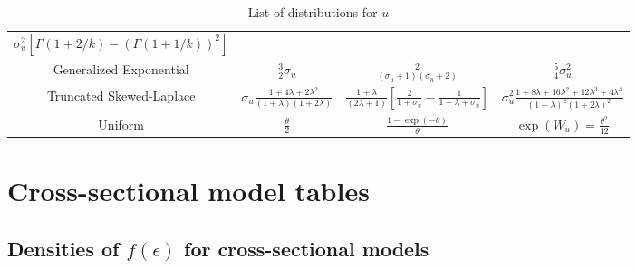 \documentclass[nojss]{jss}
\begin{document}
\begin{appendix}
\begin{table}[h]
\begin{adjustbox}{max width=1\textwidth}
\begin{tabular}{@{}cccc@{}}
$\sigma_u^2\left[\Gamma\left(1+2/k\right)-\left(\Gamma\left(1+1/k\right)\right)^2\right]$\\[1em]
Generalized Exponential & $\frac{3}{2}\sigma_u$ & $\frac{2}{\left(\sigma_u+1\right)\left(\sigma_u+2\right)}$ & $\frac{5}{4}\sigma_u^2$\\[1em]
Truncated Skewed-Laplace & $\sigma_u\frac{1+4\lambda+2\lambda^2}{\left(1+\lambda\right)\left(1+2\lambda\right)}$ & 
$\frac{1+\lambda}{\left(2\lambda+1\right)}\left[\frac{2}{1+\sigma_u}-\frac{1}{1+\lambda + \sigma_u}\right]$ & 
$\sigma_u^2\frac{1+8\lambda+16\lambda^2+12\lambda^3+4\lambda^4}{\left(1+\lambda\right)^2\left(1+2\lambda\right)^2}$\\[1em]
Uniform & $\frac{\theta}{2}$ & $\frac{1-\exp{\left(-\theta\right)}}{\theta}$ & $\exp{\left(W_u\right)}=\frac{\theta^2}{12}$\\[1em]
\bottomrule
\end{tabular}
\end{adjustbox}
\caption{List of distributions for $u$}
\label{table:momentdesn}
\end{table}

\newpage

\section{Cross-sectional model tables} \label{app:sfcross}

\setcounter{table}{0}

\subsection{Densities of $f(\epsilon)$ for cross-sectional models}


\end{appendix}
\end{document}
